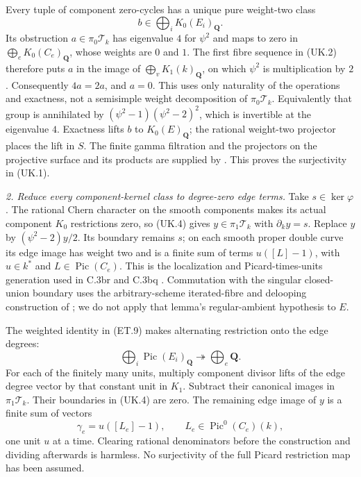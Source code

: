 Every tuple of component zero-cycles has a unique pure weight-two class
\[
                         b\in\bigoplus_iK_0(E_i)_{\mathbf Q}.
\]
Its obstruction
$a\in\pi_0\mathcal T_k$ has eigenvalue $4$ for $\psi^2$ and maps to
zero in $\bigoplus_eK_0(C_e)_{\mathbf Q}$, whose weights are $0$ and $1$.
The first fibre sequence in (UK.2) therefore puts $a$ in the image of
$\bigoplus_vK_1(k)_{\mathbf Q}$, on which $\psi^2$ is multiplication by
$2$.  Consequently $4a=2a$, and $a=0$.  This uses only naturality of
the operations and exactness, not a semisimple weight decomposition of
$\pi_0\mathcal T_k$.  Equivalently that group is annihilated by
$(\psi^2-1)(\psi^2-2)^2$, which is invertible at the eigenvalue $4$.
Exactness lifts $b$ to $K_0(E)_{\mathbf Q}$; the rational weight-two
projector places the lift in $S$.  The finite gamma filtration and the
projectors on the projective surface and its products are supplied by
\citet[Chapter II, Proposition 4.9, Theorem 4.10, and Remark 8.8.5]
{D_Weibel2013KbookII}.  This proves the surjectivity in (UK.1).

\emph{2. Reduce every component-kernel class to degree-zero edge terms.}
Take $s\in\ker\varphi$.  The rational Chern character on the smooth
components makes its actual component $K_0$ restrictions zero, so
(UK.4) gives $y\in\pi_1\mathcal T_k$ with $\partial_k y=s$.
Replace $y$ by $(\psi^2-2)y/2$.  Its boundary remains $s$; on each
smooth proper double curve its edge image has weight two and is a
finite sum of terms $u([L]-1)$, with $u\in k^*$ and
$L\in\operatorname{Pic}(C_e)$.
This is the localization and Picard-times-units generation used in
C.3br and C.3bq
\citep[Section 7, Propositions 2.10 and 3.2]{rootQuillen1973}
\citep[Lemma 5.2 and its full proof, pp.~395--396]{D_PedriniWeibel1994}.
Commutation with the singular closed-union boundary uses the
arbitrary-scheme iterated-fibre and delooping construction of
\citet[p.~258, paragraph preceding Lemma 2.1]{frC3bcLevine1994};
we do not apply that lemma's regular-ambient hypothesis to $E$.

The weighted identity in (ET.9) makes alternating restriction onto
the edge degrees:
\[
 \bigoplus_i\operatorname{Pic}(E_i)_{\mathbf Q}
                  \twoheadrightarrow\bigoplus_e\mathbf Q.
\]
For each of the finitely many units, multiply component
divisor lifts of the edge degree vector by that constant unit in
$K_1$.  Subtract their canonical images in $\pi_1\mathcal T_k$.
Their boundaries in (UK.4) are zero.  The remaining edge image of $y$
is a finite sum of vectors
\begin{equation}
       \gamma_e=u([L_e]-1),\qquad
       L_e\in\operatorname{Pic}^0(C_e)(k),                \tag{UK.5}
\end{equation}
one unit $u$ at a time.  Clearing rational denominators before the
construction and dividing afterwards is harmless.  No surjectivity
of the full Picard restriction map has been assumed.

